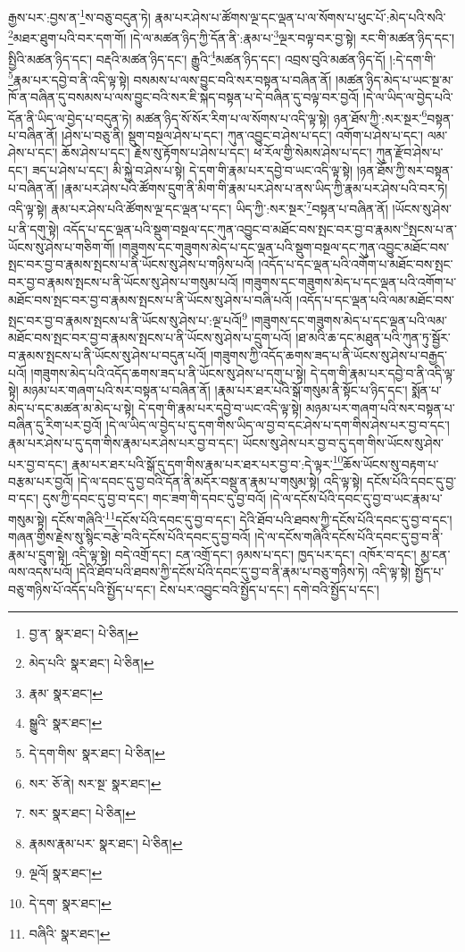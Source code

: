 རྒྱས་པར་:བྱས་ན་\footnote{བྱ་ན་  སྣར་ཐང་།  པེ་ཅིན། }ས་བཅུ་བདུན་ཏེ། རྣམ་པར་ཤེས་པ་ཚོགས་ལྔ་དང་ལྡན་པ་ལ་སོགས་པ་ཕུང་པོ་:མེད་པའི་སའི་\footnote{མེད་པའི་  སྣར་ཐང་།  པེ་ཅིན། }མཐར་ཐུག་པའི་བར་དག་གོ། །དེ་ལ་མཚན་ཉིད་ཀྱི་དོན་ནི་:རྣམ་པ་\footnote{རྣམ་  སྣར་ཐང་། }ལྔར་བལྟ་བར་བྱ་སྟེ། རང་གི་མཚན་ཉིད་དང་། སྤྱིའི་མཚན་ཉིད་དང་། བརྡའི་མཚན་ཉིད་དང་། རྒྱུའི་\footnote{སྒྱུའི་  སྣར་ཐང་། }མཚན་ཉིད་དང་། འབྲས་བུའི་མཚན་ཉིད་དོ། །:དེ་དག་གི་\footnote{དེ་དག་གིས་  སྣར་ཐང་།  པེ་ཅིན། }རྣམ་པར་དབྱེ་བ་ནི་འདི་ལྟ་སྟེ། བསམས་པ་ལས་བྱུང་བའི་སར་བསྟན་པ་བཞིན་ནོ། །མཚན་ཉིད་མེད་པ་ཡང་སྔ་མ་ཁོ་ན་བཞིན་དུ་བསམས་པ་ལས་བྱུང་བའི་སར་ཇི་སྐད་བསྟན་པ་དེ་བཞིན་དུ་བལྟ་བར་བྱའོ། །དེ་ལ་ཡིད་ལ་བྱེད་པའི་དོན་ནི་ཡིད་ལ་བྱེད་པ་བདུན་ཏེ། མཚན་ཉིད་སོ་སོར་རིག་པ་ལ་སོགས་པ་འདི་ལྟ་སྟེ། ཉན་ཐོས་ཀྱི་:སར་སྔར་\footnote{སར་  ཅོ་ནེ། སར་སྔ་  སྣར་ཐང་། }བསྟན་པ་བཞིན་ནོ། །ཤེས་པ་བཅུ་ནི། སྡུག་བསྔལ་ཤེས་པ་དང་། ཀུན་འབྱུང་བ་ཤེས་པ་དང་། འགོག་པ་ཤེས་པ་དང་། ལམ་ཤེས་པ་དང་། ཆོས་ཤེས་པ་དང་། རྗེས་སུ་རྟོགས་པ་ཤེས་པ་དང་། ཕ་རོལ་གྱི་སེམས་ཤེས་པ་དང་། ཀུན་རྫོབ་ཤེས་པ་དང་། ཟད་པ་ཤེས་པ་དང་། མི་སྐྱེ་བ་ཤེས་པ་སྟེ། དེ་དག་གི་རྣམ་པར་དབྱེ་བ་ཡང་འདི་ལྟ་སྟེ། །ཉན་ཐོས་ཀྱི་སར་བསྟན་པ་བཞིན་ནོ། །རྣམ་པར་ཤེས་པའི་ཚོགས་དྲུག་ནི་མིག་གི་རྣམ་པར་ཤེས་པ་ནས་ཡིད་ཀྱི་རྣམ་པར་ཤེས་པའི་བར་ཏེ། འདི་ལྟ་སྟེ། རྣམ་པར་ཤེས་པའི་ཚོགས་ལྔ་དང་ལྡན་པ་དང་། ཡིད་ཀྱི་:སར་སྔར་\footnote{སར་  སྣར་ཐང་།  པེ་ཅིན། }བསྟན་པ་བཞིན་ནོ། །ཡོངས་སུ་ཤེས་པ་ནི་དགུ་སྟེ། འདོད་པ་དང་ལྡན་པའི་སྡུག་བསྔལ་དང་ཀུན་འབྱུང་བ་མཐོང་བས་སྤང་བར་བྱ་བ་རྣམས་\footnote{རྣམས་རྣམ་པར་  སྣར་ཐང་།  པེ་ཅིན། }སྤངས་པ་ན་ཡོངས་སུ་ཤེས་པ་གཅིག་གོ། །གཟུགས་དང་གཟུགས་མེད་པ་དང་ལྡན་པའི་སྡུག་བསྔལ་དང་ཀུན་འབྱུང་མཐོང་བས་སྤང་བར་བྱ་བ་རྣམས་སྤངས་པ་ནི་ཡོངས་སུ་ཤེས་པ་གཉིས་པའོ། །འདོད་པ་དང་ལྡན་པའི་འགོག་པ་མཐོང་བས་སྤང་བར་བྱ་བ་རྣམས་སྤངས་པ་ནི་ཡོངས་སུ་ཤེས་པ་གསུམ་པའོ། །གཟུགས་དང་གཟུགས་མེད་པ་དང་ལྡན་པའི་འགོག་པ་མཐོང་བས་སྤང་བར་བྱ་བ་རྣམས་སྤངས་པ་ནི་ཡོངས་སུ་ཤེས་པ་བཞི་པའོ། །འདོད་པ་དང་ལྡན་པའི་ལམ་མཐོང་བས་སྤང་བར་བྱ་བ་རྣམས་སྤངས་པ་ནི་ཡོངས་སུ་ཤེས་པ་:ལྔ་པའོ།\footnote{ལྔའོ།  སྣར་ཐང་། } །གཟུགས་དང་གཟུགས་མེད་པ་དང་ལྡན་པའི་ལམ་མཐོང་བས་སྤང་བར་བྱ་བ་རྣམས་སྤངས་པ་ནི་ཡོངས་སུ་ཤེས་པ་དྲུག་པའོ། །ཐ་མའི་ཆ་དང་མཐུན་པའི་ཀུན་ཏུ་སྦྱོར་བ་རྣམས་སྤངས་པ་ནི་ཡོངས་སུ་ཤེས་པ་བདུན་པའོ། །གཟུགས་ཀྱི་འདོད་ཆགས་ཟད་པ་ནི་ཡོངས་སུ་ཤེས་པ་བརྒྱད་པའོ། །གཟུགས་མེད་པའི་འདོད་ཆགས་ཟད་པ་ནི་ཡོངས་སུ་ཤེས་པ་དགུ་པ་སྟེ། དེ་དག་གི་རྣམ་པར་དབྱེ་བ་ནི་འདི་ལྟ་སྟེ། མཉམ་པར་གཞག་པའི་སར་བསྟན་པ་བཞིན་ནོ། །རྣམ་པར་ཐར་པའི་སྒོ་གསུམ་ནི་སྟོང་པ་ཉིད་དང་། སྨོན་པ་མེད་པ་དང་མཚན་མ་མེད་པ་སྟེ། དེ་དག་གི་རྣམ་པར་དབྱེ་བ་ཡང་འདི་ལྟ་སྟེ། མཉམ་པར་གཞག་པའི་སར་བསྟན་པ་བཞིན་དུ་རིག་པར་བྱའོ། །དེ་ལ་ཡིད་ལ་བྱེད་པ་དུ་དག་གིས་ཡིད་ལ་བྱ་བ་དང་ཤེས་པ་དག་གིས་ཤེས་པར་བྱ་བ་དང་། རྣམ་པར་ཤེས་པ་དུ་དག་གིས་རྣམ་པར་ཤེས་པར་བྱ་བ་དང་། ཡོངས་སུ་ཤེས་པར་བྱ་བ་དུ་དག་གིས་ཡོངས་སུ་ཤེས་པར་བྱ་བ་དང་། རྣམ་པར་ཐར་པའི་སྒོ་དུ་དག་གིས་རྣམ་པར་ཐར་པར་བྱ་བ་:དེ་ལྟར་\footnote{དེ་དག་  སྣར་ཐང་། }ཆོས་ཡོངས་སུ་བརྟག་པ་བརྩམ་པར་བྱའོ། །དེ་ལ་དབང་དུ་བྱ་བའི་དོན་ནི་མདོར་བསྡུ་ན་རྣམ་པ་གསུམ་སྟེ། འདི་ལྟ་སྟེ། དངོས་པོའི་དབང་དུ་བྱ་བ་དང་། དུས་ཀྱི་དབང་དུ་བྱ་བ་དང་། གང་ཟག་གི་དབང་དུ་བྱ་བའོ། །དེ་ལ་དངོས་པོའི་དབང་དུ་བྱ་བ་ཡང་རྣམ་པ་གསུམ་སྟེ། དངོས་གཞིའི་\footnote{བཞིའི་  སྣར་ཐང་། }དངོས་པོའི་དབང་དུ་བྱ་བ་དང་། དེའི་ཐོབ་པའི་ཐབས་ཀྱི་དངོས་པོའི་དབང་དུ་བྱ་བ་དང་། གཞན་གྱིས་རྗེས་སུ་སྙིང་བརྩེ་བའི་དངོས་པོའི་དབང་དུ་བྱ་བའོ། །དེ་ལ་དངོས་གཞིའི་དངོས་པོའི་དབང་དུ་བྱ་བ་ནི་རྣམ་པ་དྲུག་སྟེ། འདི་ལྟ་སྟེ། བདེ་འགྲོ་དང་། ངན་འགྲོ་དང་། ཉམས་པ་དང་། ཁྱད་པར་དང་། འཁོར་བ་དང་། མྱ་ངན་ལས་འདས་པའོ། །དེའི་ཐོབ་པའི་ཐབས་ཀྱི་དངོས་པོའི་དབང་དུ་བྱ་བ་ནི་རྣམ་པ་བཅུ་གཉིས་ཏེ། འདི་ལྟ་སྟེ། སྤྱོད་པ་བཅུ་གཉིས་པོ་འདོད་པའི་སྤྱོད་པ་དང་། ངེས་པར་འབྱུང་བའི་སྤྱོད་པ་དང་། དགེ་བའི་སྤྱོད་པ་དང་། 